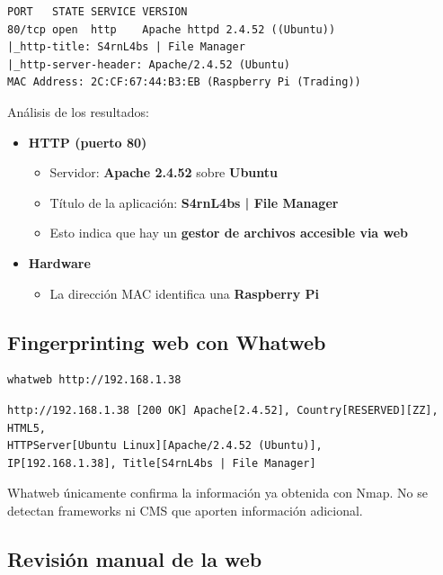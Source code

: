 \documentclass[12pt,a4paper]{article}
\begin{document}
\begin{lstlisting}[style=output]
PORT   STATE SERVICE VERSION
80/tcp open  http    Apache httpd 2.4.52 ((Ubuntu))
|_http-title: S4rnL4bs | File Manager
|_http-server-header: Apache/2.4.52 (Ubuntu)
MAC Address: 2C:CF:67:44:B3:EB (Raspberry Pi (Trading))
\end{lstlisting}

Análisis de los resultados:

\begin{itemize}
  \item \textbf{HTTP (puerto 80)}
  \begin{itemize}
    \item Servidor: \textbf{Apache 2.4.52} sobre \textbf{Ubuntu}
    \item Título de la aplicación: \textbf{S4rnL4bs | File Manager}
    \item Esto indica que hay un \textbf{gestor de archivos accesible via web}
  \end{itemize}
  \item \textbf{Hardware}
  \begin{itemize}
    \item La dirección MAC identifica una \textbf{Raspberry Pi}
  \end{itemize}
\end{itemize}

\subsection{Fingerprinting web con Whatweb}

\begin{lstlisting}[language=bash]
whatweb http://192.168.1.38
\end{lstlisting}

\begin{lstlisting}[style=output]
http://192.168.1.38 [200 OK] Apache[2.4.52], Country[RESERVED][ZZ], HTML5,
HTTPServer[Ubuntu Linux][Apache/2.4.52 (Ubuntu)],
IP[192.168.1.38], Title[S4rnL4bs | File Manager]
\end{lstlisting}

Whatweb únicamente confirma la información ya obtenida con Nmap. No se detectan frameworks ni CMS que aporten información adicional.

\subsection{Revisión manual de la web}
\end{document}
